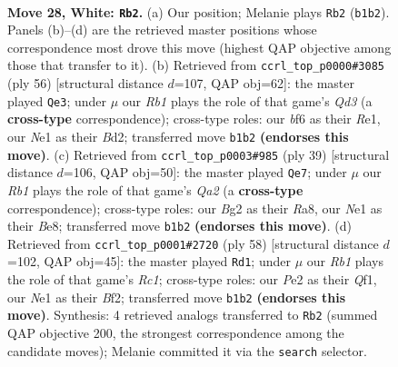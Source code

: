 \documentclass[11pt]{article}
\begin{document}
\clearpage

\begin{figure}[p]\centering
\begin{subfigure}{0.46\textwidth}\centering
\resizebox{\linewidth}{!}{%
\newchessgame
\chessboard[
  setfen={1r1q2k1/p1n2rn1/b4bpp/2p2p2/P2p1P2/1P2N1P1/Q3P1BP/1RBRN1K1 w - - 0 28},
  showmover=false,
  pgfstyle=straightmove, color=movearrow, markmove={b1-b2}
]}
\caption{}
\end{subfigure}\hfill
\begin{subfigure}{0.46\textwidth}\centering
\resizebox{\linewidth}{!}{%
\newchessgame
\chessboard[
  setfen={3rq1k1/pnr1bpp1/Bp2p2p/8/b2PP3/P2Q1N1P/1R1B1PP1/4R1K1 w - - 4 29},
  showmover=false,
  pgfstyle=straightmove, color=movearrow, markmove={d3-e3}
]}
\caption{}
\end{subfigure}
\\[4pt]
\begin{subfigure}{0.46\textwidth}\centering
\resizebox{\linewidth}{!}{%
\newchessgame
\chessboard[
  setfen={r1r1b1k1/q4pp1/p3pn1p/2b5/1nN5/1PB1PN1P/1Q2BPP1/R1R3K1 b - - 3 20},
  showmover=false,
  pgfstyle=straightmove, color=movearrow, markmove={a7-e7}
]}
\caption{}
\end{subfigure}\hfill
\begin{subfigure}{0.46\textwidth}\centering
\resizebox{\linewidth}{!}{%
\newchessgame
\chessboard[
  setfen={q2r1nk1/pbr1bpp1/1p2p2p/1B2P2P/P2N1P2/2P1R3/5BPK/2R2Q2 w - - 7 30},
  showmover=false,
  pgfstyle=straightmove, color=movearrow, markmove={c1-d1}
]}
\caption{}
\end{subfigure}
\caption{\textbf{Move 28, White: \texttt{Rb2}.} (a) Our position; Melanie plays \texttt{Rb2} (\texttt{b1b2}). Panels (b)--(d) are the retrieved master positions whose correspondence most drove this move (highest QAP objective among those that transfer to it). (b) Retrieved from \texttt{ccrl\_top\_p0000\#3085} (ply 56) [structural distance $d$=107, QAP obj=62]: the master played \texttt{Qe3}; under $\mu$ our \emph{Rb1} plays the role of that game's \emph{Qd3} (a \textbf{cross-type} correspondence); cross-type roles: our \emph{b}f6 as their \emph{R}e1, our \emph{N}e1 as their \emph{B}d2; transferred move \texttt{b1b2} \textbf{(endorses this move)}. (c) Retrieved from \texttt{ccrl\_top\_p0003\#985} (ply 39) [structural distance $d$=106, QAP obj=50]: the master played \texttt{Qe7}; under $\mu$ our \emph{Rb1} plays the role of that game's \emph{Qa2} (a \textbf{cross-type} correspondence); cross-type roles: our \emph{B}g2 as their \emph{R}a8, our \emph{N}e1 as their \emph{B}e8; transferred move \texttt{b1b2} \textbf{(endorses this move)}. (d) Retrieved from \texttt{ccrl\_top\_p0001\#2720} (ply 58) [structural distance $d$=102, QAP obj=45]: the master played \texttt{Rd1}; under $\mu$ our \emph{Rb1} plays the role of that game's \emph{Rc1}; cross-type roles: our \emph{P}e2 as their \emph{Q}f1, our \emph{N}e1 as their \emph{B}f2; transferred move \texttt{b1b2} \textbf{(endorses this move)}. Synthesis: 4 retrieved analogs transferred to \texttt{Rb2} (summed QAP objective 200, the strongest correspondence among the candidate moves); Melanie committed it via the \texttt{search} selector.}
\label{fig:thought-m54}
\end{figure}
\end{document}
